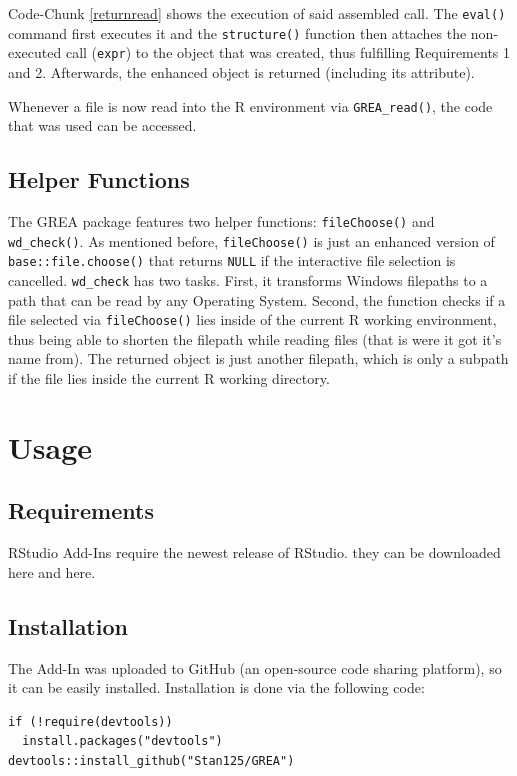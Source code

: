 \documentclass[12pt]{article} %
\newcommand{\li}{\lstinline}
\begin{document}
Code-Chunk \ref{returnread} shows the execution of said assembled call. The \li{eval()} command first executes it and the \li{structure()} function then attaches the non-executed call (\li{expr}) to the object that was created, thus fulfilling Requirements 1 and 2. Afterwards, the enhanced object is returned (including its attribute).

Whenever a file is now read into the R environment via \li{GREA_read()}, the code that was used can be accessed.

\subsection{Helper Functions}
The GREA package features two helper functions: \li{fileChoose()} and \li{wd_check()}. As mentioned before, \li{fileChoose()} is just an enhanced version of \li{base::file.choose()} that returns \li{NULL} if the interactive file selection is cancelled. \li{wd_check} has two tasks. First, it transforms Windows filepaths to a path that can be read by any Operating System. Second, the function checks if a file selected via \li{fileChoose()} lies inside of the current R working environment, thus being able to shorten the filepath while reading files (that is were it got it's name from). The returned object is just another filepath, which is only a subpath if the file lies inside the current R working directory. 

\section{Usage}

\subsection{Requirements}

RStudio Add-Ins require the newest release of RStudio. they can be downloaded here and here.

\subsection{Installation}
The Add-In was uploaded to GitHub (an open-source code sharing platform), so it can be easily installed. Installation is done via the following code: 
\begin{lstlisting}[caption = Installation of GREA, label = installationcode]
if (!require(devtools))
  install.packages("devtools")
devtools::install_github("Stan125/GREA")
\end{lstlisting}
\end{document}

